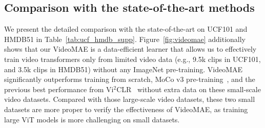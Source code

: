 \documentclass{article}
\begin{document}
\subsection{Comparison with the state-of-the-art methods}\label{sec:sota}
We present the detailed comparison with the state-of-the-art on UCF101 and HMDB51 in Table~\ref{tab:ucf_hmdb_supp}. 
Figure~\ref{fig:videomae} additionally shows that our VideoMAE is a data-efficient learner that allows us to effectively train video transformers only from limited video data (e.g., 9.5k clips in UCF101, and 3.5k clips in HMDB51) without any ImageNet pre-training. VideoMAE significantly outperforms training from scratch, MoCo v3 pre-training~\cite{mocov3}, and the previous best performance from Vi$^2$CLR~\cite{Diba_2021_ICCV} without extra data on these small-scale video datasets. Compared with those large-scale video datasets, these two small datasets are more proper to verify the effectiveness of VideoMAE, as training large ViT models is more challenging on small datasets.
\end{document}

